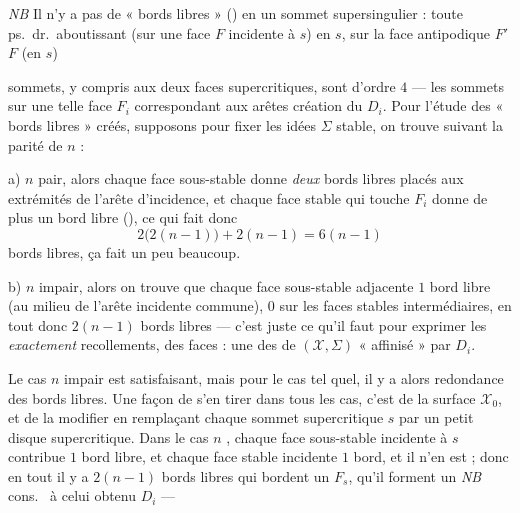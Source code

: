 \documentclass[11pt,a4paper]{article}
\begin{document}

\emph{NB} Il n'y a pas de « bords libres » () en un sommet supersingulier : toute  ps.\ dr.\ aboutissant (sur une face $F$ incidente à $s$) en $s$,  sur la face antipodique $F'$  $F$ (en $s$)

sommets, y compris aux \struck{\ill{}}  deux faces supercritiques, sont d'ordre $4$ --- les sommets sur une telle face $F_i$ correspondant aux  arêtes  \ill{} création du $D_i$. Pour l'étude des « bords libres » créés, supposons pour fixer les idées $\Sigma$ stable, on trouve suivant la parité de $n$ :

a) $n$ pair, alors chaque face sous-stable donne \emph{deux} bords libres placés aux extrémités de l'arête d'incidence, et chaque face stable qui touche $F_i$ donne de plus un bord libre (\ill{}), ce qui fait donc
\[
2\bigl(2(n-1)\bigr) + 2(n-1) = 6(n-1)
\]
bords libres, ça fait un peu beaucoup.

b) $n$ impair, alors on trouve que chaque face sous-stable adjacente  $1$ bord libre (au milieu de l'arête incidente commune), $0$ sur les faces stables intermédiaires, en tout donc $2(n-1)$ bords libres --- c'est juste ce qu'il faut pour exprimer les \emph{exactement} \ill{} recollements, \ill{} des faces : \ill{} une des  de $(\mathcal{X}, \Sigma)$ « affinisé » par $D_i$.

Le cas $n$ impair est satisfaisant, mais pour le cas  tel quel,  il y a alors redondance des bords libres. Une façon de s'en tirer dans tous les cas, c'est de   la surface $\mathcal{X}_0$, et de la modifier en remplaçant chaque sommet supercritique $s$ par un petit disque supercritique. Dans le cas $n$ \struck{\ill{}} , chaque face sous-stable incidente à $s$ contribue $1$ bord libre, et chaque face stable incidente $1$ bord, et il n'en est \ill{} ; donc en tout il y a $2(n-1)$ bords libres qui bordent un $F_s$, \ill{} qu'il forment un \struck{\ill{}} \emph{NB}  cons.\ \ill{} à celui obtenu \ill{} $D_i$ --- \ill{}
\end{document}
